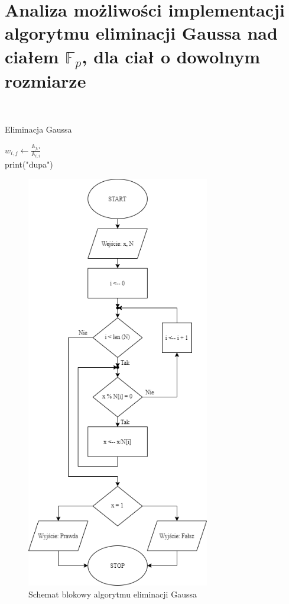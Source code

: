 \documentclass[]{article}
\begin{document}
\section{Analiza możliwości implementacji algorytmu eliminacji Gaussa nad ciałem $\mathbb{F}_p$, dla ciał o dowolnym rozmiarze}~
	\begin{algorithm}
		\SetAlgoLined
		\caption{Eliminacja Gaussa}
		\label{Gauss}
		{
			\(w_{i,j} \gets \frac{\mathbb{A}_{j,i}}{\mathbb{A}_{i,i}}\)\\
			{
				print("dupa")
			}
		}

	\end{algorithm}

\begin{figure}[H]
	\begin{center}
		\includegraphics[width=8cm]{./img/3.png}
		\caption{Schemat blokowy algorytmu eliminacji Gaussa}
	\end{center}
\end{figure}
\end{document}
